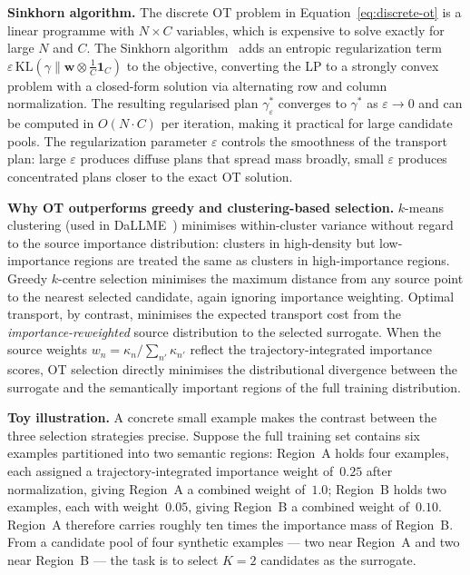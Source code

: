 \begin{foldable}
  \textbf{Sinkhorn algorithm.}
  The discrete OT problem in Equation~\ref{eq:discrete-ot} is a linear programme with $N \times C$ variables, which is expensive to solve exactly for large $N$ and $C$.
  The Sinkhorn algorithm~\cite{cuturi2013sinkhorn} adds an entropic regularization term $\varepsilon \, \mathrm{KL}(\gamma \| \mathbf{w} \otimes \tfrac{1}{C}\mathbf{1}_C)$ to the objective, converting the LP to a strongly convex problem with a closed-form solution via alternating row and column normalization.
  The resulting regularised plan $\gamma_\varepsilon^*$ converges to $\gamma^*$ as $\varepsilon \to 0$ and can be computed in $O(N \cdot C)$ per iteration, making it practical for large candidate pools.
  The regularization parameter $\varepsilon$ controls the smoothness of the transport plan: large $\varepsilon$ produces diffuse plans that spread mass broadly, small $\varepsilon$ produces concentrated plans closer to the exact OT solution.
\end{foldable}

\begin{foldable}
  \textbf{Why OT outperforms greedy and clustering-based selection.}
  $k$-means clustering (used in DaLLME~\cite{tao2024textual}) minimises within-cluster variance without regard to the source importance distribution: clusters in high-density but low-importance regions are treated the same as clusters in high-importance regions.
  Greedy $k$-centre selection minimises the maximum distance from any source point to the nearest selected candidate, again ignoring importance weighting.
  Optimal transport, by contrast, minimises the expected transport cost from the \emph{importance-reweighted} source distribution to the selected surrogate.
  When the source weights $w_n = \kappa_n / \sum_{n'}\kappa_{n'}$ reflect the trajectory-integrated importance scores, OT selection directly minimises the distributional divergence between the surrogate and the semantically important regions of the full training distribution.
\end{foldable}

\begin{foldable}
  \textbf{Toy illustration.}
  A concrete small example makes the contrast between the three selection strategies precise.
  Suppose the full training set contains six examples partitioned into two semantic regions: Region~A holds four examples, each assigned a trajectory-integrated importance weight of~$0.25$ after normalization, giving Region~A a combined weight of~$1.0$;
  Region~B holds two examples, each with weight~$0.05$, giving Region~B a combined weight of~$0.10$.
  Region~A therefore carries roughly ten times the importance mass of Region~B.
  From a candidate pool of four synthetic examples --- two near Region~A and two near Region~B --- the task is to select $K = 2$ candidates as the surrogate.
\end{foldable}

